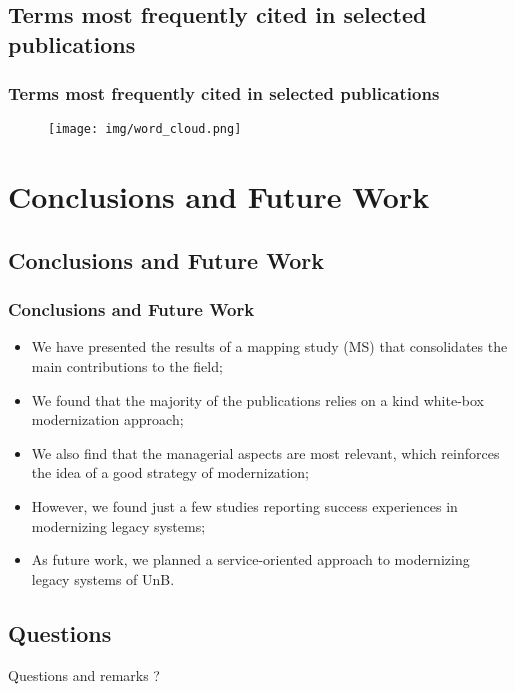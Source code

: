 \documentclass{beamer}
\begin{document}



\subsection{Terms most frequently cited in selected publications}



\begin{frame}
  \frametitle{Terms most frequently cited in selected publications}

  	
	\begin{figure}
		\texttt{[image: img/word\_cloud.png]}
	\end{figure}

\end{frame}







\section{Conclusions and Future Work}


\subsection{Conclusions and Future Work}


\begin{frame}
  \frametitle{Conclusions and Future Work}

  \begin{itemize}
    \item<1->We have presented the results of a mapping study (MS) that 
    			consolidates the main contributions to the field;
    \item<1->We found that the majority of the publications 
    			relies on a kind white-box modernization 
    			approach;
	\item<1->We also find that the managerial aspects are most 
			relevant, which reinforces the idea of a good
			strategy of modernization;
	\item<1->However, we found just a few studies reporting success 
			experiences in modernizing legacy systems;
	\item<1->As future work, we planned a service-oriented approach to 
			modernizing legacy systems of UnB.
  \end{itemize}
  
\end{frame}






\subsection{Questions}


\begin{frame}[c]{ }
\centering
  \huge{Questions and remarks ?}
\end{frame}
\end{document}
